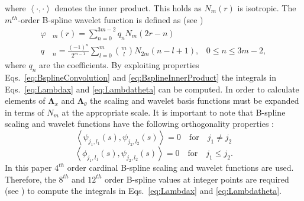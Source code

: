\documentclass[journal,a4paper]{IEEEtran}
\begin{document}
where $\left\langle \cdot,\cdot\right\rangle $ denotes the inner product. This holds as $N_m\left(r\right)$ is isotropic. The $m^{th}$-order B-spline wavelet function is defined as (see \cite{Chui1992}) 
\begin{align}
 \varphi & _{m}\left(r\right) = \sum_{n=0}^{3m-2} q_n N_{m}\left(2r-n\right) \\
 q & _n = \frac{\left(-1\right)^n}{2^{m-1}} \sum_{l=0}^{m} \binom{m}{l} N_{2m}\left(n-l+1\right), \,  \text{ $0\le n\le 3m-2$},
\end{align}
where $q_n$ are the coefficients. By exploiting properties Eqs.~\ref{eq:BsplineConvolution} and \ref{eq:BsplineInnerProduct} the integrals in Eqs.~\ref{eq:Lambdax} and \ref{eq:Lambdatheta} can be computed. In order to calculate elements of $\boldsymbol\Lambda_{x}$ and $\boldsymbol\Lambda_{\theta}$ the scaling and wavelet basis functions must be expanded in terms of $N_m$ at the appropriate scale. It is important to note that B-spline scaling and wavelet functions have the following orthogonality properties \cite{Unser1993}: 
\begin{equation}
 \left\langle \psi_{j_1,l_1}(s),\psi_{j_2,l_2}(s)\right\rangle =0  \quad \mathrm{for} \quad j_1\neq j_2
\label{PsiPsiOrthogonality}
\end{equation}
\begin{equation}
 \left\langle \phi_{j_1,l_1}(s),\psi_{j_2,l_2}(s)\right\rangle =0  \quad \mathrm{for} \quad j_1\leq j_2.
\label{PhiPsiOrthogonality}
\end{equation}
In this paper $4^{th}$ order cardinal B-spline scaling and wavelet functions are used. Therefore, the $8^{th}$ and $12^{th}$ order B-spline values at integer points are required (see \cite{Goswami1999}) to compute the integrals in Eqs.~\ref{eq:Lambdax} and \ref{eq:Lambdatheta}.
\end{document}
